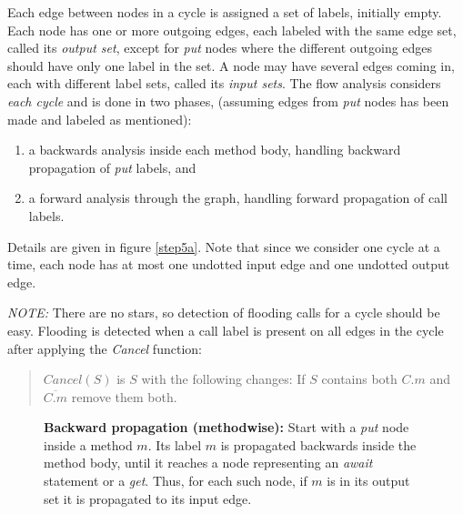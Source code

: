 \documentclass[12pt]{article}%
\begin{document}
{%
Each edge between nodes in a cycle is assigned  a set of labels,
initially empty.
Each node has one or more outgoing edges, each labeled with the same edge set, 
called its \emph{output set},
except for \emph{put} nodes where the different outgoing edges should have
only one label in the set.
A node may have several edges coming in, each with different label sets,
called its  \emph{input sets}.
The flow analysis
considers \emph{each cycle} and 
 is done in two phases,
(assuming edges from \emph{put} nodes has been made and labeled as mentioned):
\begin{enumerate}
\item
a backwards analysis inside each method body, handling 
backward propagation of \emph{put} labels,
 and 
\item
a forward analysis through the graph, 
handling forward propagation of call labels.
\end{enumerate}
Details are given in figure \ref{step5a}.
Note that since we consider one cycle at a time,
each node has at most one undotted input edge and one 
undotted output edge.




\emph{NOTE:} There are no stars, %
so detection of flooding calls for a cycle should be easy.
Flooding is detected when a call label is present
on all edges in the cycle after applying the \emph{Cancel} function:
\begin{quote}
  $Cancel(S)$ is $S$ with the following changes:\newline
If $S$ contains both $C.m$ and $\overline{C.m}$ remove them both.
\end{quote}

\begin{figure}
\begin{shaded}

\textbf{Backward propagation (methodwise):}
Start with a \emph{put} node inside  a method $m$. 
Its  label $m$  is propagated backwards 
inside the method body, until it reaches 
a node representing an
\emph{await} statement or a \emph{get}.
Thus, for each such node, if  $m$ is in %
 its output set it is 
propagated to  its  input edge. %




\end{shaded}
\end{figure}}
\end{document}

